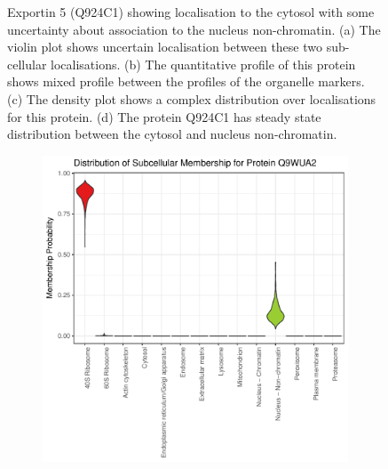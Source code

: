 \documentclass[12pt,english]{article}
\begin{document}
\begin{figure}[h]
  \caption{Exportin 5 (Q924C1) showing localisation to the
  cytosol with some uncertainty about association to the nucleus non-chromatin.
  (a) The violin plot shows
    uncertain localisation between these two sub-cellular
    localisations. (b) The
    quantitative profile of this protein shows mixed profile between the
    profiles of the organelle markers. (c) The density plot shows a
    complex distribution over localisations for this protein. (d) The protein Q924C1 has steady state
    distribution between the cytosol and nucleus non-chromatin.}
  \label{fig:Q924C1}
\end{figure}

\begin{figure}[h]
  \centering
  \begin{subfigure}[t]{0.5\textwidth}
    \centering
\includegraphics{tagm-019}
    \caption{}
  \end{subfigure}%
  \begin{subfigure}[t]{0.5\textwidth}
    \centering

\end{subfigure}
\end{figure}
\end{document}
